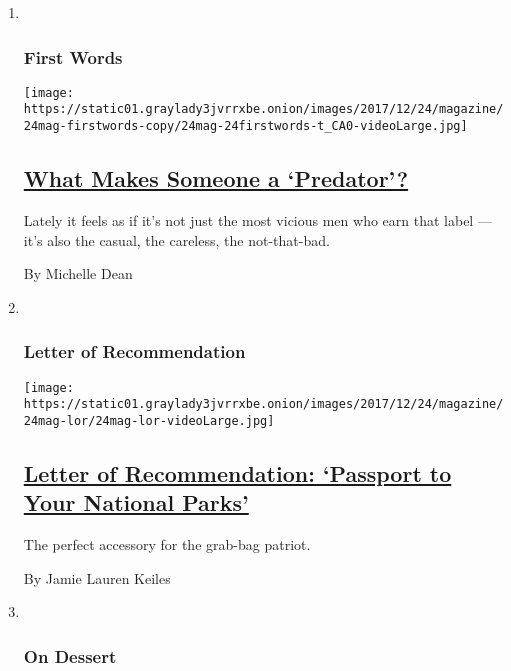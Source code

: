 \begin{enumerate}
\def\labelenumi{\arabic{enumi}.}
\item ~
  \hypertarget{first-words}{%
  \subsubsection{First Words}\label{first-words}}

  \texttt{[image: https://static01.graylady3jvrrxbe.onion/images/2017/12/24/magazine/24mag-firstwords-copy/24mag-24firstwords-t\_CA0-videoLarge.jpg]}

  \hypertarget{what-makes-someone-a-predator}{%
  \subsection{\texorpdfstring{\href{/2017/12/19/magazine/what-makes-someone-a-predator.html}{What
  Makes Someone a
  `Predator'?}}{What Makes Someone a `Predator'?}}\label{what-makes-someone-a-predator}}

  Lately it feels as if it's not just the most vicious men who earn that
  label --- it's also the casual, the careless, the not-that-bad.

  By Michelle Dean
\item ~
  \hypertarget{letter-of-recommendation}{%
  \subsubsection{Letter of
  Recommendation}\label{letter-of-recommendation}}

  \texttt{[image: https://static01.graylady3jvrrxbe.onion/images/2017/12/24/magazine/24mag-lor/24mag-lor-videoLarge.jpg]}

  \hypertarget{letter-of-recommendation-passport-to-your-national-parks}{%
  \subsection{\texorpdfstring{\href{/2017/12/21/magazine/letter-of-recommendation-passport-to-your-national-parks.html}{Letter
  of Recommendation: `Passport to Your National
  Parks'}}{Letter of Recommendation: `Passport to Your National Parks'}}\label{letter-of-recommendation-passport-to-your-national-parks}}

  The perfect accessory for the grab-bag patriot.

  By Jamie Lauren Keiles
\item ~
  \hypertarget{on-dessert}{%
  \subsubsection{On Dessert}\label{on-dessert}}


\end{enumerate}
